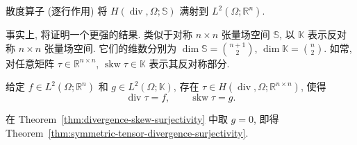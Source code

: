\begin{Theorem}\label{thm:symmetric-tensor-divergence-surjectivity}
散度算子 (逐行作用) 将 $H(\operatorname{div},\Omega;\mathbb S)$ 满射到 $L^2(\Omega;\mathbb R^n)$.
\end{Theorem}

事实上, 将证明一个更强的结果. 类似于对称 $n\times n$ 张量场空间 $\mathbb S$, 以 $\mathbb K$ 表示反对称 $n\times n$ 张量场空间. 它们的维数分别为 $\dim\mathbb S=\binom{n+1}2$, $\dim\mathbb K=\binom n2$. 如常, 对任意矩阵 $\tau\in\mathbb R^{n\times n}$, $\operatorname{skw}\tau\in\mathbb K$ 表示其反对称部分.

\begin{Theorem}\label{thm:divergence-skew-surjectivity}
给定 $f\in L^2(\Omega;\mathbb R^n)$ 和 $g\in L^2(\Omega;\mathbb K)$, 存在 $\tau\in H(\operatorname{div},\Omega;\mathbb R^{n\times n})$, 使得
\[
\operatorname{div}\tau=f,\qquad\operatorname{skw}\tau=g.
\]
\end{Theorem}

在 Theorem~\ref{thm:divergence-skew-surjectivity} 中取 $g=0$, 即得 Theorem~\ref{thm:symmetric-tensor-divergence-surjectivity}.

